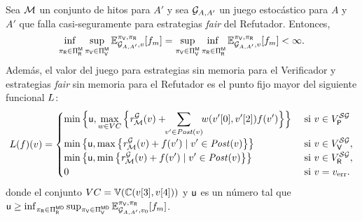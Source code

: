 \begin{theorem}\label{theo:det-fairness}
Sea $\milestones$ un conjunto de hitos para $A'$ y sea  $\StochG_{A,A'}$ un juego estocástico para $A$ y $A'$ que falla casi-seguramente para estrategias \emph{fair} del Refutador.  Entonces,  
\[\adjustlimits
 \inf_{\strat{\Refuter} \in \Strategies{\Refuter}^{\Memoryless}} \sup_{\strat{\Verifier} \in \Strategies{\Verifier}^{\Memoryless}}  \mathbb{E}^{\strat{\Verifier},\strat{\Refuter}}_{\StochG_{A,A'}, v}[\FMask] 
    = 
    \adjustlimits    
    \sup_{\strat{\Verifier} \in \Strategies{\Verifier}^{\Memoryless}} \inf_{\strat{\Refuter} \in \Strategies{\Refuter}^{\Memoryless}}    \mathbb{E}^{\strat{\Verifier},\strat{\Refuter}}_{\StochG_{A,A'}, v}[\FMask] 
    < \infty.
\]
Además, 
el valor del juego para estrategias sin memoria para el Verificador y estrategias \emph{fair} sin memoria para el Refutador es el punto fijo mayor del siguiente funcional  $\Bellman$: 
%
{\small
\[
    \Bellman(f)(v) =
    \begin{cases}
           \displaystyle \min \Big\{\upperbound,  \max_{w \in VC} \Big\{ \mreward^\StochG(v)  +\!\! \sum_{v' \in \post(v)}\!\! w(\pr{0}{v'},\pr{2}{v'})  f(v') \Big\} \Big\}& \text{ si }v \in V^{\SymbG}_\Probabilistic  \\
           \displaystyle \min \big\{ \upperbound, \max \big\{\mreward^\StochG(v)  + f(v') \mid v' \in \post(v) \big\} \big\} & \text{ si } v \in  V^{\SymbG}_\Verifier, \\
           \displaystyle \min \big\{ \upperbound,  \min \big\{\mreward^\StochG(v)  + f(v') \mid v' \in \post(v) \big\} \big\} & \text{ si } v \in  V^{\SymbG}_\Refuter, \\
           \displaystyle 0 & \text{ si } v=\ErrorSt.
           \displaystyle 
    \end{cases}
\]}%
donde el conjunto $VC=\vertices{\couplings{\pr{3}{v}}{\pr{4}{v}}}$ y $\upperbound$ es un número tal que
$\upperbound \geq \inf_{\strat{\Refuter} \in \Strategies{\Refuter}^{\Memoryless\Deterministic}} \sup_{\strat{\Verifier} \in \Strategies{\Verifier}^{\Memoryless\Deterministic}} \Expect{\strat{\Verifier}}{\strat{\Refuter}}_{\StochG_{A,A'}, \InitVertex}[\FMask]$.
\end{theorem}


